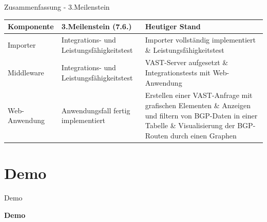 \documentclass[9pt]{beamer}
\begin{document}
\begin{frame}{Zusammenfassung - 3.Meilenstein}
	\begin{table}[h!]
	\centering
	\begin{tabular}{p{5em} p{12em} p{14em}}
		\textbf{Komponente} & \textbf{3.Meilenstein (7.6.)} & \textbf{Heutiger Stand} \\ \midrule
		Importer & Integrations- und Leistungsfähigkeitstest & Importer vollständig implementiert \& Leistungsfähigkeitstest \\ \midrule
		Middleware &  Integrations- und Leistungsfähigkeitstest & VAST-Server aufgesetzt \& Integrationstests mit Web-Anwendung \\ \midrule
		Web-Anwendung &  Anwendungsfall fertig implementiert & Erstellen einer VAST-Anfrage mit grafischen Elementen \& Anzeigen und filtern von BGP-Daten in einer Tabelle \& Visualisierung der BGP-Routen durch einen Graphen \\ \bottomrule
	\end{tabular}
	\end{table}
\end{frame}

\section{Demo}

\begin{frame}{Demo}
		\begin{center}
			\LARGE \textbf{Demo}
		\end{center}

\end{frame}
\end{document}
